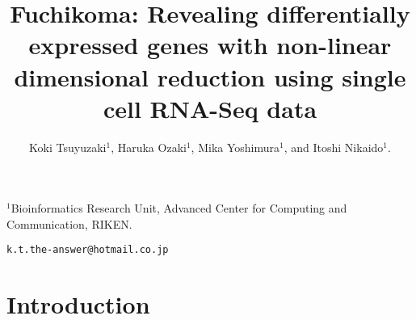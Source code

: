 \documentclass[11pt]{article}
\newcommand{\Rpackage}[1]{{\textit{#1}}}
\begin{document}
\title{\bf Fuchikoma: Revealing differentially expressed genes with non-linear dimensional reduction using single cell RNA-Seq data}
\author{Koki Tsuyuzaki$^1$, Haruka Ozaki$^1$, Mika Yoshimura$^1$, and Itoshi Nikaido$^1$.}
\maketitle
\begin{center}
\noindent
$^1$Bioinformatics Research Unit, Advanced Center for Computing and Communication, RIKEN.\\
\end{center}

\begin{center}
{\tt k.t.the-answer@hotmail.co.jp}
\end{center}
\tableofcontents

\newpage
\section{Introduction}

\end{document}
